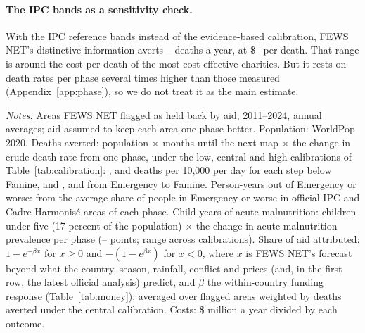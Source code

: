 \documentclass[11pt]{article}
\begin{document}
\begin{appendices}
\paragraph{The IPC bands as a sensitivity check.} With the IPC reference bands instead of the evidence-based calibration, FEWS NET's distinctive information averts \ipcDeathsLo{}--\ipcDeathsHi{} deaths a year, at \$\ipcDistinctLo{}--\ipcDistinctHi{} per death. That range is around the cost per death of the most cost-effective charities. But it rests on death rates per phase several times higher than those measured (Appendix~\ref{app:phase}), so we do not treat it as the main estimate.

\begin{table}[htbp]
\centering
\caption{A rough benefit-cost calculation: FEWS NET credited with its distinctive information}\label{tab:bcr}
\scriptsize
\resizebox{\textwidth}{!}{}
\par\vspace{4pt}\begin{minipage}{\textwidth}\scriptsize \textit{Notes:} Areas FEWS NET flagged as held back by aid, 2011--2024, annual averages; aid assumed to keep each area one phase better. Population: WorldPop 2020. Deaths averted: population $\times$ months until the next map $\times$ the change in crude death rate from one phase, under the low, central and high calibrations of Table~\ref{tab:calibration}: \calCdrLo{}, \calCdrMid{} and \calCdrHi{} deaths per 10,000 per day for each step below Famine, and \calFamLo{}, \calFamMid{} and \calFamHi{} from Emergency to Famine. Person-years out of Emergency or worse: from the average share of people in Emergency or worse in official IPC and Cadre Harmonis\'e areas of each phase. Child-years of acute malnutrition: children under five (17 percent of the population) $\times$ the change in acute malnutrition prevalence per phase (\calGamLo{}--\calGamHi{} points; range across calibrations). Share of aid attributed: $1-e^{-\beta x}$ for $x\ge 0$ and $-(1-e^{\beta x})$ for $x<0$, where $x$ is FEWS NET's forecast beyond what the country, season, rainfall, conflict and prices (and, in the first row, the latest official analysis) predict, and $\beta$ the within-country funding response (Table~\ref{tab:money}); averaged over flagged areas weighted by deaths averted under the central calibration. Costs: \$\bcBudget{} million a year divided by each outcome.\end{minipage}
\end{table}


\end{appendices}
\end{document}
